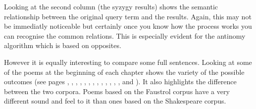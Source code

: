 Looking at the second column (the syzygy results) shows the semantic relationship between the original query term and the results. Again, this may not be immediatly noticeable but certainly once you know how the process works you can recognise the common relations. This is especially evident for the antinomy algorithm which is based on opposites.

\spirals

However it is equally interesting to compare some full sentences. Looking at some of the poems at the beginning of each chapter shows the variety of the possible outcomes (see pages \pageref{ch:introduction}, \pageref{ch:inspirations}, \pageref{ch:methodology}, \pageref{ch:pataphysics}, \pageref{ch:creativity}, \pageref{ch:technology}, \pageref{ch:evaluation}, \pageref{ch:foundations}, \pageref{ch:interpretation}, \pageref{ch:implementation}, \pageref{ch:applications}, \pageref{ch:analysis}, \pageref{ch:aspirations}, and \pageref{ch:observations}). It also highlights the difference between the two corpora. Poems based on the Faustrol corpus have a very different sound and feel to it than ones based on the Shakespeare corpus.

